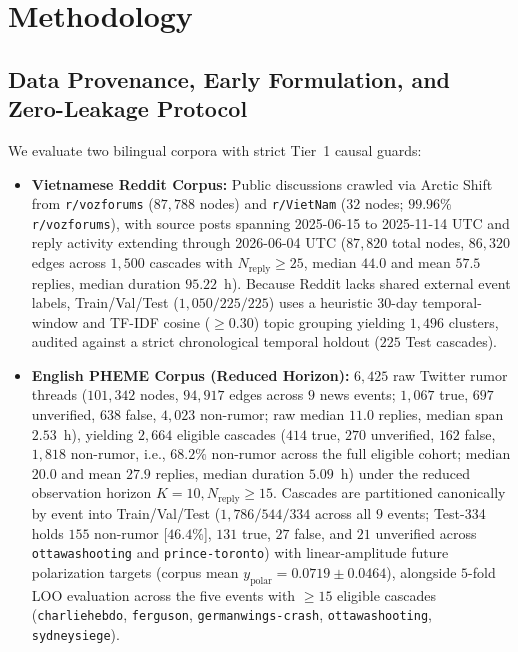 \documentclass[conference]{IEEEtran}
\begin{document}
\section{Methodology}\label{sec:method}
\subsection{Data Provenance, Early Formulation, and Zero-Leakage Protocol}
We evaluate two bilingual corpora with strict Tier~1 causal guards:
\begin{itemize}
    \item \textbf{Vietnamese Reddit Corpus:} Public discussions crawled via Arctic Shift from \texttt{r/vozforums} ($87{,}788$ nodes) and \texttt{r/VietNam} ($32$ nodes; $99.96\%$ \texttt{r/vozforums}), with source posts spanning 2025-06-15 to 2025-11-14 UTC and reply activity extending through 2026-06-04 UTC ($87{,}820$ total nodes, $86{,}320$ edges across $1{,}500$ cascades with $N_{\text{reply}} \ge 25$, median $44.0$ and mean $57.5$ replies, median duration $95.22$~h). Because Reddit lacks shared external event labels, Train/Val/Test ($1{,}050/225/225$) uses a heuristic 30-day temporal-window and TF-IDF cosine ($\ge 0.30$) topic grouping yielding $1{,}496$ clusters, audited against a strict chronological temporal holdout ($225$ Test cascades).
    \item \textbf{English PHEME Corpus (Reduced Horizon):} $6{,}425$ raw Twitter rumor threads ($101{,}342$ nodes, $94{,}917$ edges across $9$ news events; $1{,}067$ true, $697$ unverified, $638$ false, $4{,}023$ non-rumor; raw median $11.0$ replies, median span $2.53$~h), yielding $2{,}664$ eligible cascades ($414$ true, $270$ unverified, $162$ false, $1{,}818$ non-rumor, i.e., $68.2\%$ non-rumor across the full eligible cohort; median $20.0$ and mean $27.9$ replies, median duration $5.09$~h) under the reduced observation horizon $K=10, N_{\text{reply}} \ge 15$. Cascades are partitioned canonically by event into Train/Val/Test ($1{,}786/544/334$ across all $9$ events; Test-334 holds $155$ non-rumor [$46.4\%$], $131$ true, $27$ false, and $21$ unverified across \texttt{ottawashooting} and \texttt{prince-toronto}) with linear-amplitude future polarization targets (corpus mean $y_{\text{polar}} = 0.0719 \pm 0.0464$), alongside $5$-fold LOO evaluation across the five events with $\ge 15$ eligible cascades (\texttt{charliehebdo}, \texttt{ferguson}, \texttt{germanwings-crash}, \texttt{ottawashooting}, \texttt{sydneysiege}).
\end{itemize}
\end{document}

